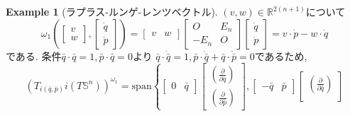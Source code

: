 \documentclass[a4paper]{ujarticle}
\numberwithin{equation}{section}
\theoremstyle{definition}
\newtheorem{example}{Example}
\begin{document}
\begin{example}[ラプラス-ルンゲ-レンツベクトル]
            $(v, w) \in \mathbb{R}^{2(n+1)}$について
            \[
                \omega_1(
                    \begin{bmatrix}
                        v \\
                        w
                    \end{bmatrix},
                    \begin{bmatrix}
                        \dot{q} \\
                        \dot{p}
                    \end{bmatrix}
                    )
                    = \begin{bmatrix}
                        v & w
                    \end{bmatrix}
                    \begin{bmatrix}
                        O & E_n \\
                        -E_n & O
                    \end{bmatrix}
                    \begin{bmatrix}
                        \dot{q} \\
                        \dot{p}
                    \end{bmatrix}
                    = v \cdot \dot{p} - w \cdot \dot{q}
            \]
            である. 条件$\bar{q} \cdot \bar{q} = 1, \bar{p} \cdot \bar{q} = 0$より
            $\bar{q} \cdot \dot{\bar{q}} = 1, \bar{p} \cdot \dot{\bar{q}} + \bar{q} \cdot \dot{\bar{p}} = 0$であるため, 
            \[
                    (T_{i(\bar{q}, \bar{p})}i(T \mathbb{S}^n))^{\omega_1} 
                    = \textrm{span} \left\{
                    \begin{bmatrix}
                        0 &
                        \bar{q}
                    \end{bmatrix}
                    \begin{bmatrix}
                        \left(\frac{\partial}{\partial \bar{q}}\right) \\
                        \left(\frac{\partial}{\partial \bar{p}}\right)
                    \end{bmatrix}, 
                    \begin{bmatrix}
                        -\bar{q} &
                        \bar{p}
                    \end{bmatrix}
                    \begin{bmatrix}
                        \left(\frac{\partial}{\partial \bar{q}}\right) \\

\end{bmatrix}\]
\end{example}
\end{document}
